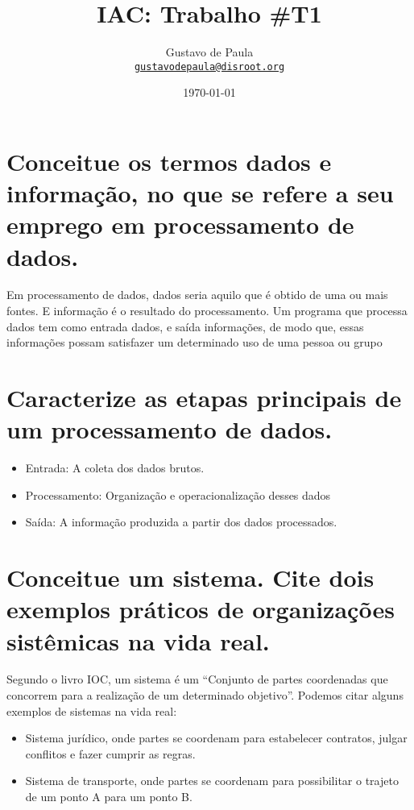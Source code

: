 \documentclass[11pt]{article}
\author{Gustavo de Paula\\ \texttt{\href{mailto:gustavodepaula@disroot.org}{gustavodepaula@disroot.org}}\\ \affil{Facultade de Tecnologia de São Paulo}}
\date{\today}
\title{IAC: Trabalho \#T1}
\begin{document}
\maketitle
\tableofcontents


\section{Conceitue os termos dados e informação, no que se refere a seu emprego em processamento de dados.}
\label{sec:org4ef4548}
Em processamento de dados, dados seria aquilo que é obtido de uma ou mais
fontes. E informação é o resultado do processamento. Um programa que processa
dados tem como entrada dados, e saída informações, de modo que, essas
informações possam satisfazer um determinado uso de uma pessoa ou grupo
\section{Caracterize as etapas principais de um processamento de dados.}
\label{sec:orgace2ea8}
\begin{itemize}
\item Entrada: A coleta dos dados brutos.
\item Processamento: Organização e operacionalização desses dados
\item Saída: A informação produzida a partir dos dados processados.
\end{itemize}
\section{Conceitue um sistema. Cite dois exemplos práticos de organizações sistêmicas na vida real.}
\label{sec:orge661e4a}
Segundo o livro IOC, um sistema é um “Conjunto de partes coordenadas que
concorrem para a realização de um determinado objetivo”. Podemos citar alguns
exemplos de sistemas na vida real:
\begin{itemize}
\item Sistema jurídico, onde partes se coordenam para estabelecer contratos, julgar
conflitos e fazer cumprir as regras.
\item Sistema de transporte, onde partes se coordenam para possibilitar o trajeto de
um ponto A para um ponto B.
\end{itemize}
\end{document}
